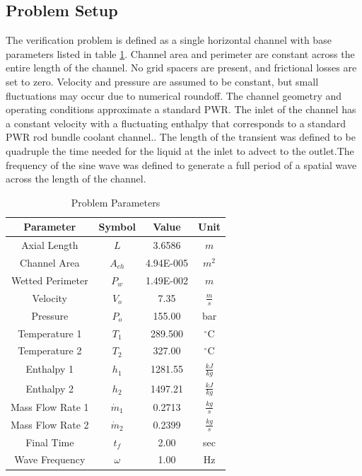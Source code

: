 \documentclass{mc2015}
\begin{document}
\subsection{Problem Setup}


The verification problem is defined as a single horizontal channel with
base parameters listed in table \ref{table:parameters}. Channel area and
perimeter are constant across the entire length of the channel. No grid spacers
are present, and frictional losses are set to zero. Velocity and pressure
are assumed to be constant, but small fluctuations may occur due to numerical
roundoff. The channel geometry and operating conditions approximate a standard
PWR. The inlet of the channel has a constant velocity with a fluctuating
enthalpy that corresponds to a standard PWR rod bundle coolant channel..  The
length of the transient was defined to be quadruple the time needed for the liquid at the
inlet to advect to the outlet.The frequency of the sine wave was defined to
generate a full period of a spatial wave across the length of the channel.

\begin{table}[h]
\center
\caption{Problem Parameters}
\label{table:parameters}
\begin{tabular}{|c|c|c|c|}
\hline
Parameter	&	Symbol	&	Value	&	Unit	\\ \hline
Axial Length	&	$L$	&	3.6586	&	$m$	\\ \hline
Channel Area	&	$A_{ch}$	&	4.94E-005	&	$m^{2}$	\\ \hline
Wetted Perimeter	&	$P_{w}$	&	1.49E-002	&	$m$	\\ \hline
Velocity	&	$V_{o}$	&	7.35	&	$\frac{m}{s}$	\\ \hline
Pressure	&	$P_{o}$	&	155.00	&	bar	\\ \hline
Temperature 1	&	$T_{1}$	&	289.500	&	$^{\circ}$C	\\ \hline
Temperature 2	&	$T_{2}$	&	327.00	&	$^{\circ}$C	\\ \hline
Enthalpy 1	&	$h_{1}$	&	1281.55	&	$\frac{kJ}{kg}$	\\ \hline
Enthalpy 2	&	$h_{2}$	&	1497.21	&	$\frac{kJ}{kg}$	\\ \hline
Mass Flow Rate 1	&	$\dot{m}_{1}$	&	0.2713	&	$\frac{kg}{s}$	\\ \hline
Mass Flow Rate 2	&	$\dot{m}_{2}$	&	0.2399	&	$\frac{kg}{s}$	\\ \hline
Final Time	&	$t_{f}$	&	2.00	&	sec	\\ \hline
Wave Frequency	&	$\omega$	&	1.00	&	Hz	\\ \hline
\end{tabular}
\end{table}
\end{document}
